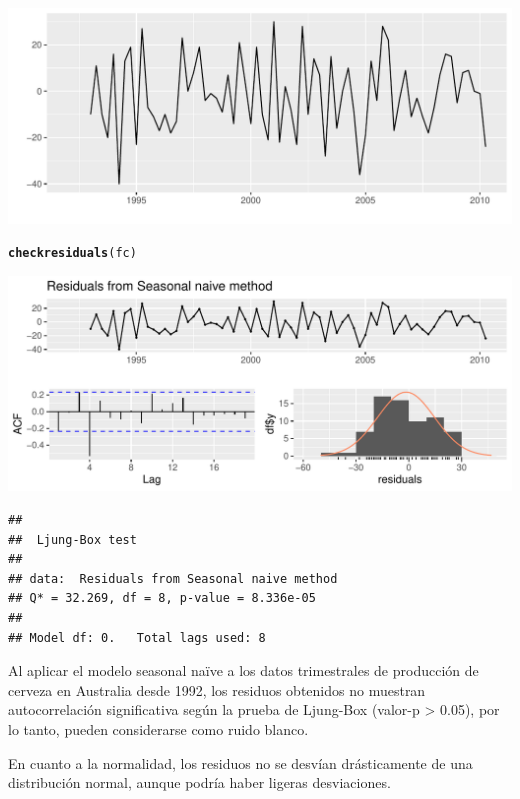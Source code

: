 \documentclass[12pt]{article}\usepackage[]{graphicx}\usepackage[]{xcolor}
\makeatletter
\def\maxwidth{ %
  \ifdim\Gin@nat@width>\linewidth
    \linewidth
  \else
    \Gin@nat@width
  \fi
}
\newcommand{\hldef}[1]{\textcolor[rgb]{0.345,0.345,0.345}{#1}}%
\newcommand{\hlkwd}[1]{\textcolor[rgb]{0.737,0.353,0.396}{\textbf{#1}}}%
\newenvironment{kframe}{%
 \def\at@end@of@kframe{}%
 \ifinner\ifhmode%
  \def\at@end@of@kframe{\end{minipage}}%
  \begin{minipage}{\columnwidth}%
 \fi\fi%
 \def\FrameCommand##1{\hskip\@totalleftmargin \hskip-\fboxsep
 \colorbox{shadecolor}{##1}\hskip-\fboxsep
     \hskip-\linewidth \hskip-\@totalleftmargin \hskip\columnwidth}%
 \MakeFramed {\advance\hsize-\width
   \@totalleftmargin\z@ \linewidth\hsize
   \@setminipage}}%
 {\par\unskip\endMakeFramed%
 \at@end@of@kframe}
\newenvironment{knitrout}{}{} %
\makeatother
\begin{document}
\begin{knitrout}
\begin{kframe}
{\ttfamily\noindent\color{warningcolor}{\#\# Warning: Removed 4 rows containing missing values or values outside the scale range (`geom\_line()`).}}\end{kframe}
\includegraphics[width=\maxwidth]{figure/unnamed-chunk-8-2} 
\begin{kframe}\begin{alltt}
\hlkwd{checkresiduals}\hldef{(fc)}
\end{alltt}
\end{kframe}
\includegraphics[width=\maxwidth]{figure/unnamed-chunk-8-3} 
\begin{kframe}\begin{verbatim}
## 
## 	Ljung-Box test
## 
## data:  Residuals from Seasonal naive method
## Q* = 32.269, df = 8, p-value = 8.336e-05
## 
## Model df: 0.   Total lags used: 8
\end{verbatim}
\end{kframe}
\end{knitrout}


Al aplicar el modelo seasonal naïve a los datos trimestrales de producción de cerveza en Australia desde 1992, los residuos obtenidos no muestran autocorrelación significativa según la prueba de Ljung-Box (valor-p > 0.05), por lo tanto, pueden considerarse como ruido blanco.

En cuanto a la normalidad, los residuos no se desvían drásticamente de una distribución normal, aunque podría haber ligeras desviaciones.
\end{document}
